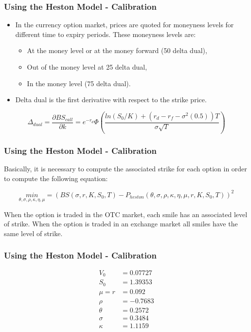 \documentclass[12pt]{beamer}
\begin{document}
\begin{frame}
\frametitle{Using the Heston Model - Calibration}
\begin{itemize}
  \item In the currency option market, prices are quoted for moneyness levels for different time to expiry periods. These moneyness levels are:
  \begin{itemize}
    \item At the money level or at the money forward (50 delta dual),
    \item Out of the money level at 25 delta dual,
    \item In the money level (75 delta dual).
  \end{itemize}
  \item Delta dual is the first derivative with respect to the strike price.
\end{itemize}
$$\Delta_{dual}=\frac{\partial BS_{call}}{\partial k}=e^{-r_{d}}\Phi \left(\frac{ln(S_{0}/K)+(r_{d}-r_{f}-\sigma^{2}(0.5))T}{\sigma \sqrt T}\right)$$
\end{frame}


\begin{frame}
\frametitle{Using the Heston Model - Calibration}
Basically, it is necessary to compute the associated strike for each option in order to compute the following equation:

$$\underset{\theta,\sigma,\rho,\kappa,\eta,\mu}{min}=(BS(\sigma,r,K,S_{0},T)-P_{heston}(\theta,\sigma,\rho,\kappa,\eta,\mu,r,K,S_{0},T))^2$$

When the option is traded in the OTC market, each smile has an associated level of strike. When the option is traded in an exchange market all smiles have the same level of strike.
\end{frame}

\begin{frame}
\frametitle{Using the Heston Model - Calibration}

\begin{align*}
V_0 &= 0.07727 \\
S_0 &= 1.39353 \\
\mu = r &= 0.092 \\
\rho &= -0.7683 \\
\theta &= 0.2572 \\
\sigma &= 0.3484 \\
\kappa &= 1.1159
\end{align*}

\end{frame}
\end{document}
